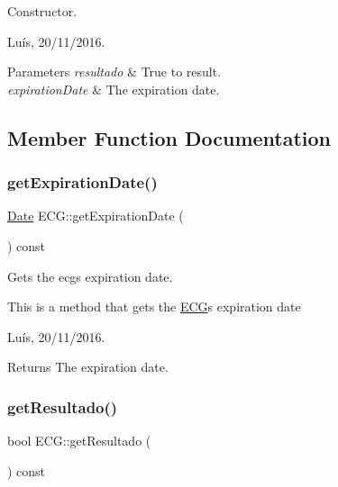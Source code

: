 Constructor. 

Luís, 20/11/2016. 


\begin{DoxyParams}{Parameters}
{\em resultado} & True to result. \\
\hline
{\em expiration\+Date} & The expiration date. \\
\hline
\end{DoxyParams}


\subsection{Member Function Documentation}
\hypertarget{class_e_c_g_afb89fa72e295fcac879c4bc341395bd4}{}\label{class_e_c_g_afb89fa72e295fcac879c4bc341395bd4} 
\subsubsection{\texorpdfstring{get\+Expiration\+Date()}{getExpirationDate()}}
{\footnotesize\ttfamily \hyperlink{class_date}{Date} E\+C\+G\+::get\+Expiration\+Date (\begin{DoxyParamCaption}{ }\end{DoxyParamCaption}) const}



Gets the ecg\textquotesingle{}s expiration date. 

This is a method that gets the \hyperlink{class_e_c_g}{E\+CG}\textquotesingle{}s expiration date

Luís, 20/11/2016. 

\begin{DoxyReturn}{Returns}
The expiration date. 
\end{DoxyReturn}
\hypertarget{class_e_c_g_a118ae9d00eff2b226cddff1aeb4e03fc}{}\label{class_e_c_g_a118ae9d00eff2b226cddff1aeb4e03fc} 
\subsubsection{\texorpdfstring{get\+Resultado()}{getResultado()}}
{\footnotesize\ttfamily bool E\+C\+G\+::get\+Resultado (\begin{DoxyParamCaption}{ }\end{DoxyParamCaption}) const}



